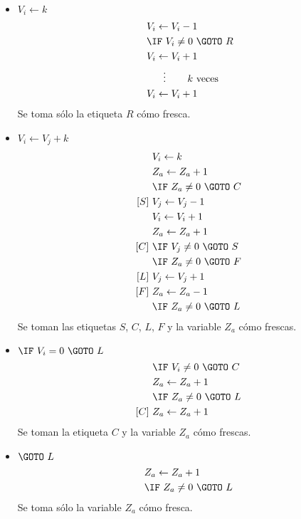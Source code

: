 \documentclass[fleqn, 11pt]{article}
\newcommand{\into}{\leftarrow}
\begin{document}
\begin{itemize}
	\item $V_i \into k$
		\begin{align*}
			[R]\ & V_i \into V_i - 1 \\
			     & \IF\ V_i \neq 0\ \GOTO\ R \\
			     & V_i \into V_i + 1 \\
			     & \hspace{1.5em} \vdots
			       \hspace{2em}k\ \text{veces} \\
			     & V_i \into V_i + 1
		\end{align*}
		Se toma sólo la etiqueta $R$ cómo fresca.
	\item $V_i \into V_j + k$
		\begin{align*}
			     & V_i \into k \\
			     & Z_a \into Z_a + 1 \\
			     & \IF\ Z_a \neq 0\ \GOTO\ C \\
			[S]\ & V_j \into V_j - 1 \\
			     & V_i \into V_i + 1 \\
			     & Z_a \into Z_a + 1 \\
			[C]\ & \IF\ V_j \neq 0\ \GOTO\ S \\
			     & \IF\ Z_a \neq 0\ \GOTO\ F \\
			[L]\ & V_j \into V_j + 1 \\
			[F]\ & Z_a \into Z_a - 1 \\
			     & \IF\ Z_a \neq 0\ \GOTO\ L
		\end{align*}
		Se toman las etiquetas $S$, $C$, $L$, $F$ y la variable
		$Z_a$ cómo frescas.
	\item $\IF\ V_i = 0\ \GOTO\ L$
		\begin{align*}
			     &\IF\ V_i \neq 0\ \GOTO\ C \\
			     &Z_a \into Z_a + 1 \\
			     &\IF\ Z_a \neq 0\ \GOTO\ L \\
			[C]\ &Z_a \into Z_a + 1 \\
		\end{align*}
		Se toman la etiqueta $C$ y la variable $Z_a$ cómo frescas.
	\item $\GOTO\ L$
		\begin{align*}
			     &Z_a \into Z_a + 1 \\
			     &\IF\ Z_a \neq 0\ \GOTO\ L \\
		\end{align*}
		Se toma sólo la variable $Z_a$ cómo fresca.
\end{itemize}
\end{document}
